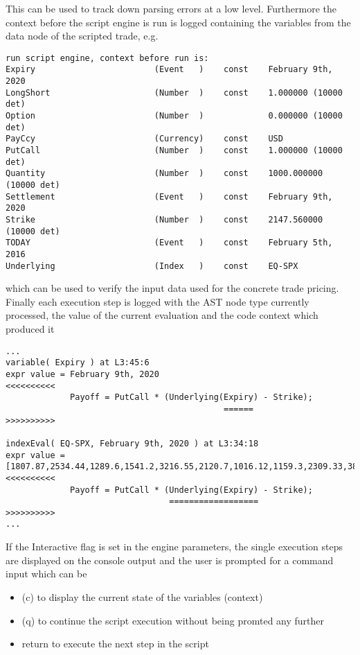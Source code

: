 This can be used to track down parsing errors at a low level. Furthermore the context before the script engine is run is
logged containing the variables from the data node of the scripted trade, e.g.

\begin{verbatim}
run script engine, context before run is:
Expiry                        (Event   )    const    February 9th, 2020
LongShort                     (Number  )    const    1.000000 (10000 det)
Option                        (Number  )             0.000000 (10000 det)
PayCcy                        (Currency)    const    USD
PutCall                       (Number  )    const    1.000000 (10000 det)
Quantity                      (Number  )    const    1000.000000 (10000 det)
Settlement                    (Event   )    const    February 9th, 2020
Strike                        (Number  )    const    2147.560000 (10000 det)
TODAY                         (Event   )    const    February 5th, 2016
Underlying                    (Index   )    const    EQ-SPX
\end{verbatim}

which can be used to verify the input data used for the concrete trade pricing. Finally each execution step is logged
with the AST node type currently processed, the value of the current evaluation and the code context which produced it

\begin{verbatim}
...
variable( Expiry ) at L3:45:6
expr value = February 9th, 2020
<<<<<<<<<<
             Payoff = PutCall * (Underlying(Expiry) - Strike);
                                            ======
>>>>>>>>>>

indexEval( EQ-SPX, February 9th, 2020 ) at L3:34:18
expr value = [1807.87,2534.44,1289.6,1541.2,3216.55,2120.7,1016.12,1159.3,2309.33,3898.24...]
<<<<<<<<<<
             Payoff = PutCall * (Underlying(Expiry) - Strike);
                                 ==================
>>>>>>>>>>
...
\end{verbatim}

If the Interactive flag is set in the engine parameters, the single execution steps are displayed on the console output
and the user is prompted for a command input which can be

\begin{itemize}
\item (c) to display the current state of the variables (context)
\item (q) to continue the script execution without being promted any further
\item return to execute the next step in the script
\end{itemize}
